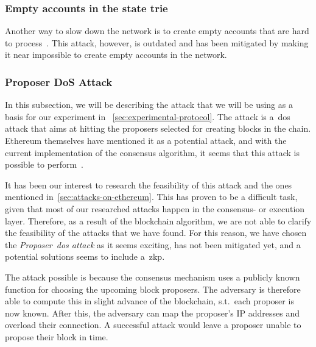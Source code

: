 \subsubsection{Empty accounts in the state trie}\label{subsubsec:empty-accounts-in-the-state-trie}
Another way to slow down the network is to create empty accounts that are hard to process~\cite{empty-account-mitigation,empty-account-eip-mitigation}.
This attack, however, is outdated and has been mitigated by making it near impossible to create empty accounts in the network.

\subsubsection{Proposer DoS Attack}\label{subsubsec:proposer-dos-attack}
In this subsection, we will be describing the attack that we will be using as a basis for our experiment in ~\autoref{sec:experimental-protocol}.
The attack is a~\gls{dos} attack that aims at hitting the proposers selected for creating blocks in the chain.
Ethereum themselves have mentioned it as a potential attack, and with the current implementation of the consensus algorithm, it seems that this attack is possible to perform~\cite{EthereumSSLE2024,EthereumAttackDefense2024}.

It has been our interest to research the feasibility of this attack and the ones mentioned in~\autoref{sec:attacks-on-ethereum}.
This has proven to be a difficult task, given that most of our researched attacks happen in the consensus- or execution layer.
Therefore, as a result of the blockchain algorithm, we are not able to clarify the feasibility of the attacks that we have found.
For this reason, we have chosen the \textit{Proposer~\gls{dos} attack} as it seems exciting, has not been mitigated yet, and a potential solutions seems to include a~\gls{zkp}.

The attack possible is because the consensus mechanism uses a publicly known function for choosing the upcoming block proposers.
The adversary is therefore able to compute this in slight advance of the blockchain, s.t.\ each proposer is now known.
After this, the adversary can map the proposer's IP addresses and overload their connection.
A successful attack would leave a proposer unable to propose their block in time.

